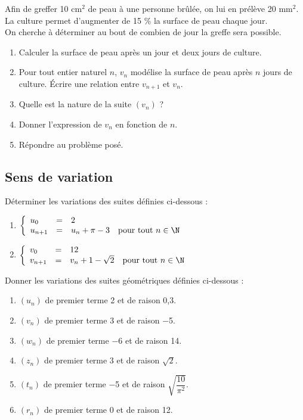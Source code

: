 \documentclass[a4paper,11pt,exos]{nsi} %
\begin{document}
Afin de greffer 10 cm$^2$ de peau à une personne brûlée, on lui en prélève 20 mm$^2$. La culture permet d'augmenter de 15 \% la surface de peau chaque jour.\\
On cherche à déterminer au bout de combien de jour la greffe sera possible.
\begin{enumerate}
	\item 	Calculer la surface de peau après un jour et deux jours de culture.
	\item 	Pour tout entier naturel $n$, $v_n$ modélise la surface de peau après $n$ jours de culture. \'Ecrire une relation entre $v_{n+1}$ et $v_n$.
	\item	Quelle est la nature de la suite $(v_n)$ ?
	\item	Donner l'expression de $v_n$ en fonction de $n$.
	\item	Répondre au problème posé.
\end{enumerate}

\newpage

\subsection*{Sens de variation}
Déterminer les variations des suites définies ci-dessous :
\begin{multicols}{2}
	\begin{enumerate}
		\item 	$\left\{
		\begin{array}{llll}
			u_0 & = & 2 &\\ 
			u_{n+1} & = & u_n+\pi-3&\text{pour tout}\  n\in\N\\
		\end{array}\right. $
		\item 	$\left\{
		\begin{array}{llll}
			v_0 & = & 12 &\\ 
			v_{n+1} & = & v_n+1-\sqrt{2}&\text{pour tout}\  n\in\N\\
		\end{array}\right. $
	\end{enumerate}
\end{multicols}


Donner les variations des suites géométriques définies ci-dessous :
\begin{multicols}{2}
	\begin{enumerate}
		\item 	$(u_n)$ de premier terme 2 et de raison 0,3.
		\item 	$(v_n)$ de premier terme 3 et de raison $-$5.
		\item 	$(w_n)$ de premier terme $-$6 et de raison 14.
		\item 	$(z_n)$ de premier terme 3 et de raison $\sqrt{2}$.
		\item	$(t_n)$ de premier terme $-$5 et de raison $\sqrt{\dfrac{10}{\pi^2}}$.
		\item 	$(r_n)$ de premier terme 0 et de raison 12.
	\end{enumerate}
\end{multicols}
\end{document}
